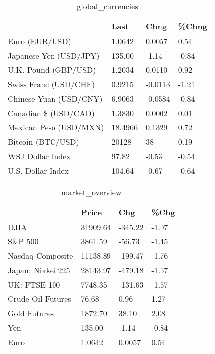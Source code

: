 \documentclass{article}%
\begin{document}
%


\begin{table}[htbp]%
\caption{global\_currencies}%
\centering%
\begin{adjustbox}{width=1\textwidth}%
\begin{tabular}{llll}
\toprule
                       &    Last &    Chng & \%Chng \\
\midrule
        Euro (EUR/USD) &  1.0642 &  0.0057 &  0.54 \\
Japanese Yen (USD/JPY) &  135.00 &   -1.14 & -0.84 \\
  U.K. Pound (GBP/USD) &  1.2034 &  0.0110 &  0.92 \\
 Swiss Franc (USD/CHF) &  0.9215 & -0.0113 & -1.21 \\
Chinese Yuan (USD/CNY) &  6.9063 & -0.0584 & -0.84 \\
  Canadian \$ (USD/CAD) &  1.3830 &  0.0002 &  0.01 \\
Mexican Peso (USD/MXN) & 18.4966 &  0.1329 &  0.72 \\
     Bitcoin (BTC/USD) &   20128 &      38 &  0.19 \\
      WSJ Dollar Index &   97.82 &   -0.53 & -0.54 \\
     U.S. Dollar Index &  104.64 &   -0.67 & -0.64 \\
\bottomrule
\end{tabular}
%
\end{adjustbox}%
\end{table}

%


\begin{table}[htbp]%
\caption{market\_overview}%
\centering%
\begin{adjustbox}{width=1\textwidth}%
\begin{tabular}{llll}
\toprule
                  &    Price &     Chg &  \%Chg \\
\midrule
             DJIA & 31909.64 & -345.22 & -1.07 \\
          S\&P 500 &  3861.59 &  -56.73 & -1.45 \\
 Nasdaq Composite & 11138.89 & -199.47 & -1.76 \\
Japan: Nikkei 225 & 28143.97 & -479.18 & -1.67 \\
     UK: FTSE 100 &  7748.35 & -131.63 & -1.67 \\
Crude Oil Futures &    76.68 &    0.96 &  1.27 \\
     Gold Futures &  1872.70 &   38.10 &  2.08 \\
              Yen &   135.00 &   -1.14 & -0.84 \\
             Euro &   1.0642 &  0.0057 &  0.54 \\
\bottomrule
\end{tabular}
%
\end{adjustbox}%
\end{table}

%
\end{document}
